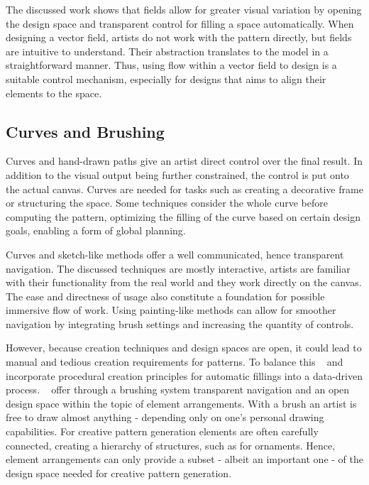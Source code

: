 The discussed work shows that fields allow for greater visual variation by opening the design space and transparent control for filling a space automatically. When designing a vector field, artists do not work with the pattern directly, but fields are intuitive to understand. Their abstraction translates to the model in a straightforward manner. Thus, using flow within a vector field to design is a suitable control mechanism, especially for designs that aims to align their elements to the space.

\subsection{Curves and Brushing}
\label{subsubsec:analysis_creative_means_curves}

Curves and hand-drawn paths give an artist direct control over the final result. In addition to the visual output being further constrained, the control is put onto the actual canvas. Curves are needed for tasks such as creating a decorative frame or structuring the space. Some techniques consider the whole curve before computing the pattern, optimizing the filling of the curve based on certain design goals, enabling a form of global planning.

Curves and sketch-like methods offer a well communicated, hence transparent navigation. The discussed techniques are mostly interactive, artists are familiar with their functionality from the real world and they work directly on the canvas. The ease and directness of usage also constitute a foundation for possible immersive flow of work. Using painting-like methods can allow for smoother navigation by integrating brush settings and increasing the quantity of controls.

However, because creation techniques and design spaces are open, it could lead to manual and tedious creation requirements for patterns. To balance this \citeauthor*{kazi_2012_vit}~\cite{kazi_2012_vit} and \citeauthor*{xing_2014_apr}~\cite{xing_2014_apr} incorporate procedural creation principles for automatic fillings into a data-driven process. \citeauthor*{hsu_2020_aef}~\cite{hsu_2020_aef} offer through a brushing system transparent navigation and an open design space within the topic of element arrangements. With a brush an artist is free to draw almost anything - depending only on one's personal drawing capabilities. For creative pattern generation elements are often carefully connected, creating a hierarchy of structures, such as for ornaments. Hence, element arrangements can only provide a subset - albeit an important one - of the design space needed for creative pattern generation. 

